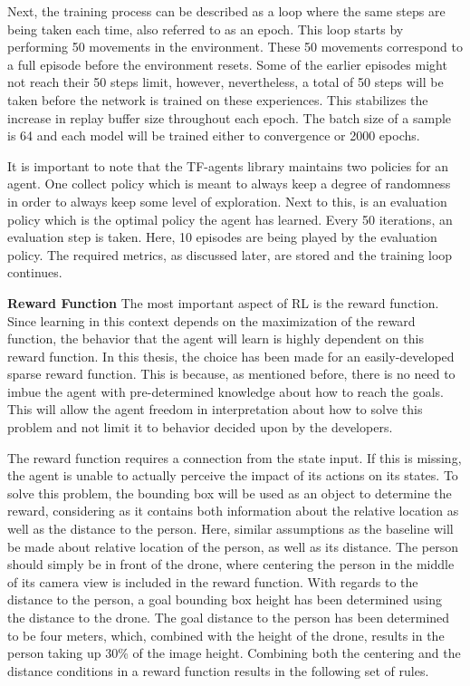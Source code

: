 Next, the training process can be described as a loop where the same steps are being taken each time, 
also referred to as an epoch. 
This loop starts by performing 50 movements in the environment. These 50 movements correspond to a full 
episode before the environment resets. Some of the earlier episodes might not reach their 50 steps 
limit, however, nevertheless, a total of 50 steps will be taken before the network is trained on 
these experiences. This stabilizes the increase in replay buffer size throughout each epoch. 
The batch size of a sample is 64 and each model will be trained either to convergence or 
2000 epochs. 

It is important to note that the TF-agents library maintains two policies for an agent. One
collect policy which is meant to always keep a degree of randomness in order to always keep some 
level of exploration. Next to this, is an evaluation policy which is the optimal policy the 
agent has learned. Every 50 iterations, an evaluation step is taken. Here, 10 episodes are 
being played by the evaluation policy. The required metrics, as discussed later, are stored and 
the training loop continues. \newline

\noindent
\textbf{Reward Function} \label{rewardfunction} \newline  
The most important aspect of RL is the reward function. Since learning in this context depends on the 
maximization of the reward function, the behavior that the agent will learn is highly dependent 
on this reward function. In this thesis, the choice has been made for an easily-developed sparse reward 
function. This is because, as mentioned before, there is no need to imbue the agent with pre-determined 
knowledge about how to reach the goals. This will allow the agent freedom in interpretation about 
how to solve this problem and not limit it to behavior decided upon by the developers. 

The reward function requires a connection from the state input. If this is missing, 
the agent is unable to actually perceive the impact of its actions on its states. To 
solve this problem, the bounding box will be used as an object to determine the reward, 
considering as it contains both information about the relative location as well as the distance 
to the person. Here, similar assumptions as the baseline will be made about relative location of 
the person, as well as its distance. The person should simply be in front of the drone, where 
centering the person in the middle of its camera view is included in the reward function. 
With regards to the distance to the person, a goal bounding box height has been determined 
using the distance to the drone. The goal distance to the person has been determined to be 
four meters, which, combined with the height of the drone, results in the person 
taking up 30\% of the image height. Combining both the centering and the distance 
conditions in a reward function results in the following set of rules. 
 
